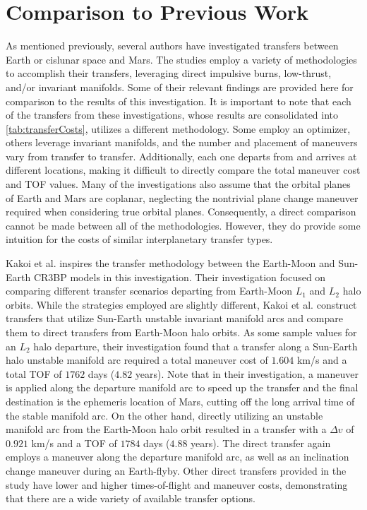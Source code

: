\section{Comparison to Previous Work}\label{sec:PreviousWork}
As mentioned previously, several authors have investigated transfers between Earth or cislunar
space and Mars. The studies employ a variety of methodologies to accomplish their transfers,
leveraging direct impulsive burns, low-thrust, and/or invariant manifolds. Some of their relevant
findings are provided here for comparison to the results of this investigation. It is important to
note that each of the transfers from these investigations, whose results are consolidated into
\cref{tab:transferCosts}, utilizes a different methodology. Some employ an optimizer, others
leverage invariant manifolds, and the number and placement of maneuvers vary from transfer to
transfer. Additionally, each one departs from and arrives at different locations, making it
difficult to directly compare the total maneuver cost and TOF values. Many of the investigations
also assume that the orbital planes of Earth and Mars are coplanar, neglecting the nontrivial plane
change maneuver required when considering true orbital planes. Consequently, a direct comparison
cannot be made between all of the methodologies. However, they do provide some intuition for the
costs of similar interplanetary transfer types.

Kakoi et al. inspires the transfer methodology between the Earth-Moon and Sun-Earth CR3BP
models in this investigation\cite{Kakoi:2014,Kakoi:2015}. Their investigation focused on comparing
different transfer scenarios departing from Earth-Moon $L_{1}$ and $L_{2}$ halo orbits. While the
strategies employed are slightly different, Kakoi et al. construct transfers that utilize Sun-Earth
unstable invariant manifold arcs and compare them to direct transfers from Earth-Moon halo orbits.
As some sample values for an $L_{2}$ halo departure, their investigation found that a transfer
along a Sun-Earth halo unstable manifold arc required a total maneuver cost of $1.604$ km/s and a
total TOF of $1762$ days ($4.82$ years). Note that in their investigation, a maneuver is applied
along the departure manifold arc to speed up the transfer and the final destination is the
ephemeris location of Mars, cutting off the long arrival time of the stable manifold arc. On the
other hand, directly utilizing an unstable manifold arc from the Earth-Moon halo orbit resulted in
a transfer with a $\Delta v$ of $0.921$ km/s and a TOF of $1784$ days ($4.88$
years)\cite{Kakoi:2015}. The direct transfer again employs a maneuver along the departure manifold
arc, as well as an inclination change maneuver during an Earth-flyby. Other direct transfers
provided in the study have lower and higher times-of-flight and maneuver costs, demonstrating that
there are a wide variety of available transfer options.

